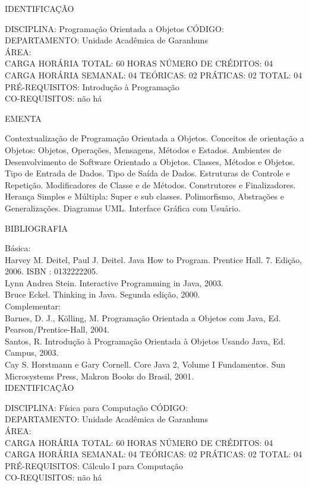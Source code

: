 \documentclass[
	12pt,				%
	openright,			%
  oneside,     %
	a4paper,			%
	chapter=TITLE,		%
	english,			%
	french,				%
	spanish,			%
	brazil				%
	]{abntex2}
\begin{document}
\begin{apendicesenv}
\newpage IDENTIFICAÇÃO

DISCIPLINA: Programação Orientada a Objetos CÓDIGO:\\ 
DEPARTAMENTO: Unidade Acadêmica de Garanhuns\\
ÁREA: \\
CARGA HORÁRIA TOTAL: 60 HORAS NÚMERO DE CRÉDITOS: 04\\
CARGA HORÁRIA SEMANAL: 04 TEÓRICAS: 02 PRÁTICAS: 02 TOTAL: 04\\
PRÉ-REQUISITOS: Introdução à Programação\\
CO-REQUISITOS: não há

EMENTA 

Contextualização de Programação Orientada a Objetos. Conceitos de
orientação a Objetos: Objetos, Operações, Mensagens, Métodos e Estados.
Ambientes de Desenvolvimento de Software Orientado a Objetos. Classes,
Métodos e Objetos. Tipo de Entrada de Dados. Tipo de Saída de Dados.
Estruturas de Controle e Repetição. Modificadores de Classe e de
Métodos. Construtores e Finalizadores. Herança Simples e Múltipla:
Super e sub classes. Polimorfismo, Abstrações e Generalizações.
Diagramas UML. Interface Gráfica com Usuário.

BIBLIOGRAFIA 

Básica:\\
Harvey M. Deitel, Paul J. Deitel. Java How to Program. Prentice Hall. 7.
Edição, 2006. ISBN : 0132222205.\\
Lynn Andrea Stein. Interactive Programming in Java, 2003.\\
Bruce Eckel. Thinking in Java. Segunda edição, 2000.\\
Complementar:\\
Barnes, D. J., Kölling, M. Programação Orientada a Objetos com Java, Ed.
Pearson/Prentice-Hall, 2004.\\
Santos, R. Introdução à Programação Orientada à Objetos Usando Java, Ed.
Campus, 2003.\\
Cay S. Horstmann e Gary Cornell. Core Java 2, Volume I  Fundamentos.
Sun Microsystems Press, Makron Books do Brasil, 2001.\\


\newpage IDENTIFICAÇÃO

DISCIPLINA: Física para Computação CÓDIGO:\\
DEPARTAMENTO: Unidade Acadêmica de Garanhuns\\ ÁREA: \\
CARGA HORÁRIA TOTAL: 60 HORAS NÚMERO DE CRÉDITOS: 04\\
CARGA HORÁRIA SEMANAL: 04 TEÓRICAS: 02 PRÁTICAS: 02 TOTAL: 04\\
PRÉ-REQUISITOS: Cálculo I para Computação\\
CO-REQUISITOS: não há


\end{apendicesenv}
\end{document}
